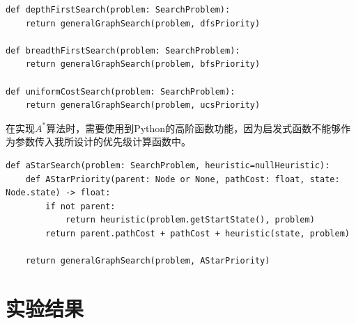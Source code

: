 \begin{lstlisting}[emph={[3]parent,pathCost,problem,heuristic,state},emphstyle={[3]\color{vscode_parametercolor}},emph={[4]SearchProblem,Callable,Node,Actions,Reached},emphstyle={[4]\color{vscode_classcolor}}]
def depthFirstSearch(problem: SearchProblem):
    return generalGraphSearch(problem, dfsPriority)

def breadthFirstSearch(problem: SearchProblem):
    return generalGraphSearch(problem, bfsPriority)

def uniformCostSearch(problem: SearchProblem):
    return generalGraphSearch(problem, ucsPriority)
\end{lstlisting}

在实现$A^*$算法时，需要使用到Python的高阶函数功能，因为启发式函数不能够作为参数传入我所设计的优先级计算函数中。
\begin{lstlisting}[emph={[3]parent,pathCost,problem,heuristic,state,position,goals},emphstyle={[3]\color{vscode_parametercolor}},emph={[4]SearchProblem,Callable,Node,Actions,Reached},emphstyle={[4]\color{vscode_classcolor}}]
def aStarSearch(problem: SearchProblem, heuristic=nullHeuristic):
    def AStarPriority(parent: Node or None, pathCost: float, state: Node.state) -> float:
        if not parent:
            return heuristic(problem.getStartState(), problem)
        return parent.pathCost + pathCost + heuristic(state, problem)

    return generalGraphSearch(problem, AStarPriority)
\end{lstlisting}
\section{实验结果}
%
%
